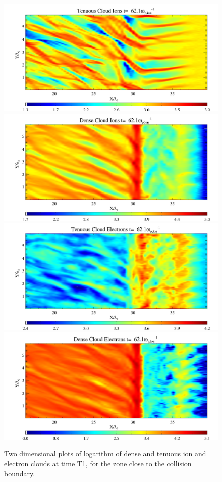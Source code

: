 \documentclass[structabstract]{aa}
\begin{document}
\begin{figure}
\centering
\includegraphics[width=\columnwidth]{15294f6a.png}
\includegraphics[width=\columnwidth]{15294f6b.png}
\includegraphics[width=\columnwidth]{15294f6c.png}
\includegraphics[width=\columnwidth]{15294f6d.png}
\caption{Two dimensional plots of logarithm of dense and tenuous ion and electron clouds at time T1, 
for the zone close to the collision boundary.}
\label{FigZoomDen}
\end{figure}
\end{document}
